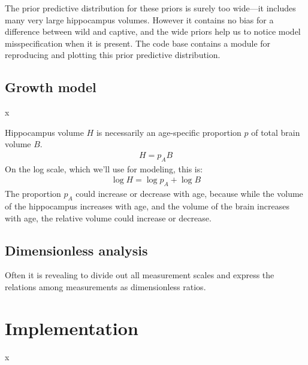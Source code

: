 \documentclass[reqno ,11pt]{amsart}
\begin{document}
The prior predictive distribution for these priors is surely too wide---it includes many very large hippocampus volumes. However it contains no bias for a difference between wild and captive, and the wide priors help us to notice model misspecification when it is present. The code base contains a module for reproducing and plotting this prior predictive distribution.


\subsection{Growth model}
x

Hippocampus volume $H$ is necessarily an age-specific proportion $p$ of total brain volume $B$.
\begin{align}
H = p_A B
\end{align}
On the log scale, which we'll use for modeling, this is:
\begin{align*}
\log H = \log p_A + \log B
\end{align*}
The proportion $p_A$ could increase or decrease with age, because while the volume of the hippocampus increases with age, and the volume of the brain increases with age, the relative volume could increase or decrease.


\subsection{Dimensionless analysis}

Often it is revealing to divide out all measurement scales and express the relations among measurements as dimensionless ratios.


\section{Implementation}

x


\clearpage
 

\end{document}
